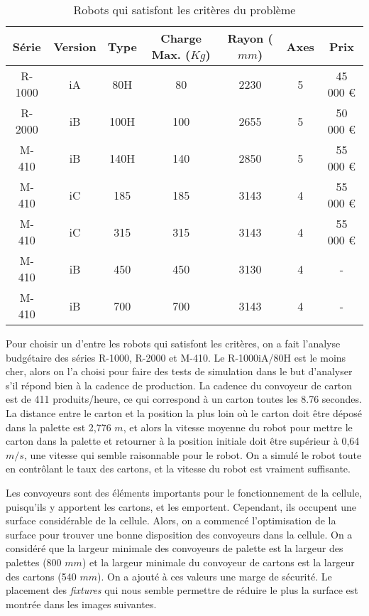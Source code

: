 \begin{table}[H]
\caption{ Robots qui satisfont les critères du problème}
\label{tab:Robots_qui_satisfont}
\centering
\begin{tabular}{c|c|c|c|c|c|c}	

	\textbf{Série} &	\textbf{Version}&	\textbf{Type}&	\textbf{Charge Max. ($ Kg $)}&	\textbf{Rayon ($ mm $)}&	\textbf{Axes}&	\textbf{Prix}\\
	\hline 
	R-1000&	iA&	80H&	80&	2230& 5& 45 000 \euro\\
	\hline 
	R-2000&	iB&	100H& 100&	2655& 5& 50 000 \euro	\\
	\hline
	M-410&	iB&	140H& 140&	2850&	5&	55 000 \euro	\\
	\hline
	M-410&	iC&	185&	185&	3143&	4&	55 000 \euro	\\
	\hline
	M-410&	iC&	315&	315&	3143&	4&	55 000 \euro	\\
	\hline
	M-410&	iB&	450&	450&	3130&	4&	-	\\
	\hline
	M-410&	iB&	700&	700&	3143&	4&	-	\\

\end{tabular} 
\end{table}
\pagebreak
Pour choisir un d'entre les robots qui satisfont les critères, on a fait l’analyse budgétaire des séries R-1000, R-2000 et M-410. Le R-1000iA/80H est le moins cher, alors on l’a choisi pour faire des tests de simulation dans le but d’analyser s’il répond bien à la cadence de production.
La cadence du convoyeur de carton est de 411 produits/heure, ce qui correspond à un carton toutes les 8.76 secondes. La distance entre le carton et la position la plus loin où le carton doit être déposé dans la palette est 2,776 $ m $, et alors la vitesse moyenne du robot pour mettre le carton dans la palette et retourner à la position initiale doit être supérieur à 0,64 $ m/s $, une vitesse qui semble raisonnable pour le robot.
On a simulé le robot toute en contrôlant le taux des cartons, et la vitesse du robot est vraiment suffisante. 


Les convoyeurs sont des éléments importants pour le fonctionnement de la cellule, puisqu’ils y apportent les cartons, et les emportent. Cependant, ils occupent une surface considérable de la cellule. Alors, on a commencé l’optimisation de la surface pour trouver une bonne disposition des convoyeurs dans la cellule. On a considéré que la largeur minimale des convoyeurs de palette est la largeur des palettes (800 $ mm $) et la largeur minimale du convoyeur de cartons est la largeur des cartons (540 $ mm $). On a ajouté à ces valeurs une marge de sécurité.
Le placement des \textit{fixtures} qui nous semble permettre de réduire le plus la surface est montrée dans les images suivantes.


